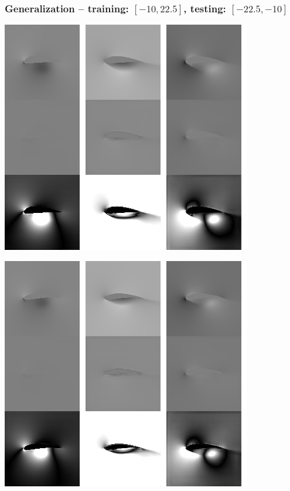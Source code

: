 \begin{frame}
    \frametitle{Generalization -- training: $[-10, 22.5]$, testing: $[-22.5, -10]$}
    \vspace*{.1cm}
\begin{multicols}{2}
	
	\includegraphics[width=.9\columnwidth, height=.6\textheight]{./Ressourcen/Praesentation/Bilder/TransferEval/interpolation/left_test/0085_bw.png}%
    \vfill\columnbreak
    
    \includegraphics[width=.9\columnwidth, height=.6\textheight]{./Ressourcen/Praesentation/Bilder/TransferEval/interpolation/left_test/0086_bw.png}%
\end{multicols}
    
\end{frame}
\clearpage

